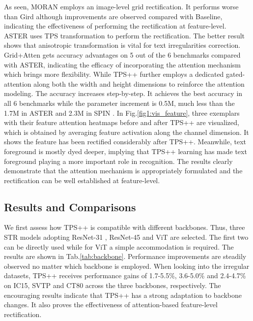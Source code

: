 \documentclass{article}
\begin{document}
As seen, MORAN employs an image-level grid rectification. It performs worse than Gird although improvements are observed compared with Baseline, indicating the effectiveness of performing the rectification at feature-level. ASTER uses TPS transformation to perform the rectification. The better result shows that anisotropic transformation is vital for text irregularities correction. Grid+Atten gets accuracy advantages on 5 out of the 6 benchmarks compared with ASTER, indicating the efficacy of incorporating the attention mechanism which brings more flexibility. While TPS++ further employs a dedicated gated-attention along both the width and height dimensions to reinforce the attention modeling. The accuracy increases step-by-step. It achieves the best accuracy in all 6 benchmarks while the parameter increment is 0.5M, much less than the 1.7M in ASTER \cite{shi2018aster} and 2.3M in SPIN \cite{zhang2021spin}. In Fig.\ref{fig1:vis_feature}, three exemplars with their feature attention heatmaps before and after TPS++ are visualized, which is obtained by averaging feature activation along the channel dimension. It shows the feature has been rectified considerably after TPS++. Meanwhile, text foreground is mostly dyed deeper, implying that TPS++ learning has made text foreground playing a more important role in recognition. The results clearly demonstrate that the attention mechanism is appropriately formulated and the rectification can be well established at feature-level.



\subsection{Results and Comparisons}

We first assess how TPS++ is compatible with different backbones. Thus, three STR models adopting ResNet-31 \cite{yue2020robustscanner}, ResNet-45 \cite{ABInet21CVPR} and ViT \cite{dosovitskiy2020image} are selected. The first two can be directly used while for ViT a simple accommodation is required. The results are shown in Tab.\ref{tab:backbone}. Performance improvements are steadily observed no matter which backbone is employed. When looking into the irregular datasets, TPS++ receives performance gains of 1.7-5.5\%, 3.6-5.0\% and 2.4-4.7\% on IC15, SVTP and CT80 across the three backbones, respectively. The encouraging results indicate that TPS++ has a strong adaptation to backbone changes. It also proves the effectiveness of attention-based feature-level rectification. 
\end{document}
